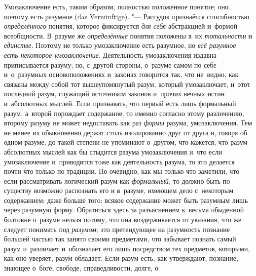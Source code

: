 Умозаключение есть, таким образом, полностью положенное понятие; оно поэтому
есть разумное (das Vernünftige). "--- Рассудок признаётся способностью
{\em определённого} понятия, которое фиксируется {\em для себя} абстракцией
и~формой всеобщности. В~разуме же {\em определённые} понятия положены в~их
{\em тотальности} и {\em единстве}. Поэтому не только умозаключение есть
разумное, но {\em всё разумное есть некоторое умозаключение}. Деятельность
умозаключения издавна приписывается разуму; но, с~другой стороны, о~разуме
самом по себе и~о~разумных основоположениях и~законах говорится так, что
не~видно, как связаны между собой тот вышеупомянутый разум, который
умозаключает, и~этот последний разум, служащий источником законов и~прочих
вечных истин и~абсолютных мыслей. Если признавать, что первый есть лишь
формальный разум, а~второй порождает содержание, то именно согласно этому
различению, второму разуму не может недоставать как раз {\em формы} разума,
умозаключения. Тем не менее их обыкновенно держат столь изолированно друг
от друга и, говоря об одном разуме, до такой степени не упоминают
о~другом, что кажется, что разум абсолютных мыслей как бы
стыдится разума умозаключения и~что если умозаключение и~приводится тоже
как деятельность разума, то это делается почти что только по традиции. Но
очевидно, как мы только что заметили, что если рассматривать логический разум
как {\em формальный,} то должно быть по существу возможно распознать его и
в~разуме, имеющем дело с~некоторым содержанием; даже больше того: всякое
содержание может быть разумным лишь через разумную форму. Обратиться здесь
за разъяснением к~весьма обыденной болтовне о~разуме нельзя потому, что она
воздерживается от указания, что же следует понимать под {\em разумом;} это
претендующее на разумность познание
большей частью так занято своими предметами, что забывает
познать самый разум и~различает и~обозначает его лишь посредством тех
предметов, которыми, как оно уверяет, разум обладает. Если разум есть, как
утверждают, познание, знающее о~боге, свободе, справедливости, долге, о
